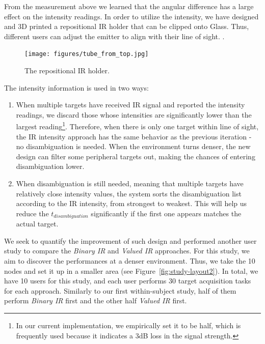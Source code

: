 From the measurement above we learned that the angular difference has a large effect on the intensity readings. In order to utilize the intensity, we have designed and 3D printed a repositional IR holder that can be clipped onto Glass. Thus, different users can adjust the emitter to align with their line of sight. . 

\begin{figure}[t]
\centering
\texttt{[image: figures/tube\_from\_top.jpg]}
\caption{The repositional IR holder.}
\label{fig:measurement}
\end{figure}



The intensity information is used in two ways:
\begin{enumerate}
\item When multiple targets have received IR signal and reported the intensity readings, we discard those whose intensities are significantly lower than the largest reading\footnote{In our current implementation, we empirically set it to be half, which is frequently used because it indicates a 3dB loss in the signal strength.}. Therefore, when there is only one target within line of sight, the IR intensity approach has the same behavior as the previous iteration - no disambiguation is needed. When the environment turns denser, the new design can filter some peripheral targets out, making the chances of entering disambiguation lower.
\item When disambiguation is still needed, meaning that multiple targets have relatively close intensity values, the system sorts the disambiguation list according to the IR intensity, from strongest to weakest. This will help us reduce the $t_{disambiguation}$ significantly if the first one appears matches the actual target.
\end{enumerate}

We seek to quantify the improvement of such design and performed another user study to compare the {\em Binary IR} and {\em Valued IR} approaches. For this study, we aim to discover the performances at a denser environment. Thus, we take the 10 nodes and set it up in a smaller area (see Figure~\ref{fig:study-layout2}). In total, we have 10 users for this study, and each user performs 30 target acquisition tasks for each approach. Similarly to our first within-subject study, half of them perform {\em Binary IR} first and the other half {\em Valued IR} first.

